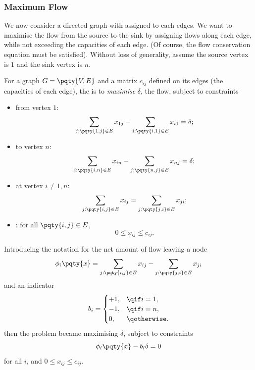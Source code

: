 \subsubsection{Maximum Flow}

We now consider a directed graph with  assigned to each edges. We want to maximise the flow from the source to the sink by assigning flows along each edge, while not exceeding the capacities of each edge. (Of course, the flow conservation equation must be satisfied). Without loss of generality, assume the source vertex is \(1\) and the sink vertex is \(n\).

\begin{definition}
    For a graph \(G = \pqty{V, E}\) and a matrix \(c_{ij}\) defined on its edges (the capacities of each edge), the  is to \emph{maximise} \(\delta\), the flow, subject to constraints
    \begin{itemize}
        \item {} from vertex \(1\):
        \[
            \sum_{j: \pqty{1, j} \in E} x_{1j} - \sum_{i: \pqty{i, 1} \in E} x_{i1} = \delta;
        \]
        \item {} to vertex \(n\):
        \[
            \sum_{i: \pqty{i, n} \in E} x_{in} - \sum_{j: \pqty{n, j} \in E} x_{nj} = \delta;
        \]
        \item {} at vertex \(i \neq 1, n\):
        \[
            \sum_{j: \pqty{i, j} \in E} x_{ij} = \sum_{j: \pqty{j, i} \in E} x_{ji};
        \]
        \item {}: for all \(\pqty{i, j} \in E\),
        \[
            0 \leq x_{ij} \leq c_{ij}.
        \]
    \end{itemize}
\end{definition}

\begin{notation}
    Introducing the notation for the net amount of flow leaving a node
    \[
        \phi_i \pqty{x} = \sum_{j: \pqty{i, j} \in E} x_{ij} - \sum_{j: \pqty{j, i} \in E} x_{ji}
    \]
    and an indicator
    \[
        b_i = \begin{cases}
            +1, &\qif i = 1, \\
            -1, &\qif i = n, \\
            0, &\qotherwise.
        \end{cases}
    \]
    then the problem became maximising \(\delta\), subject to constraints
    \[
        \phi_i \pqty{x} - b_i \delta = 0
    \]
    for all \(i\), and \(0 \leq x_{ij} \leq c_{ij}\).
\end{notation}

